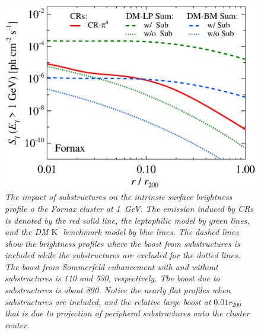 \documentclass[10pt,aps,pra,reprint,amsmath,amsfonts,amssymb,showpacs,nofootinbib,floatfix]{revtex4-1}
\newcommand{\rmn}{\mathrm}
\newcommand{\Kp}{\rmn{K}^\prime}
\newcommand{\rvir}{r_{200}}
\begin{document}
\begin{figure}%
 \includegraphics[width=0.99\columnwidth]{figures/SB.resolved.v14.1GeV.SF700.noSuB.vs.SubMass.elmu.eps}
 \caption{\it The impact of substructures on the intrinsic surface
   brightness profile o the Fornax cluster at 1~GeV. The emission
   induced by CRs is denoted by the red solid line, the leptophilic
   model by green lines, and the DM $\Kp$ benchmark model by blue
   lines. The dashed lines show the brightness profiles where the
   boost from substructures is included while the substructures are
   excluded for the dotted lines. The boost from Sommerfeld
   enhancement with and without substructures is 110 and 530,
   respectively. The boost due to substructures is about 890. Notice
   the nearly flat profiles when substructures are included, and the
   relative large boost at $0.01\rvir$ that is due to projection of
   peripheral substructures onto the cluster center.}
 \label{fig:SB_sub}
\end{figure}
\end{document}
